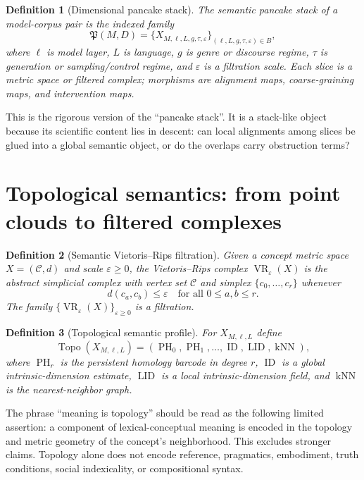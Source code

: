 \documentclass[11pt]{article}
\newtheorem{definition}{Definition}[section]
\newcommand{\Concept}{\mathcal C}
\newcommand{\VR}{\operatorname{VR}}
\newcommand{\ID}{\operatorname{ID}}
\newcommand{\eps}{\varepsilon}
\begin{document}
\begin{definition}[Dimensional pancake stack]
The semantic pancake stack of a model-corpus pair is the indexed family
\[
  \mathfrak P(M,D)=\{X_{M,\ell,L,g,\tau,\eps}\}_{(\ell,L,g,\tau,\eps)\in B},
\]
where $\ell$ is model layer, $L$ is language, $g$ is genre or discourse regime, $\tau$ is generation or sampling/control regime, and $\eps$ is a filtration scale.  Each slice is a metric space or filtered complex; morphisms are alignment maps, coarse-graining maps, and intervention maps.
\end{definition}

This is the rigorous version of the ``pancake stack''.  It is a stack-like object because its scientific content lies in descent: can local alignments among slices be glued into a global semantic object, or do the overlaps carry obstruction terms?

\section{Topological semantics: from point clouds to filtered complexes}

\begin{definition}[Semantic Vietoris--Rips filtration]
Given a concept metric space $X=(\Concept,d)$ and scale $\eps\ge0$, the Vietoris--Rips complex $\VR_\eps(X)$ is the abstract simplicial complex with vertex set $\Concept$ and simplex $\{c_0,\dots,c_r\}$ whenever
\[
  d(c_a,c_b)\le \eps\quad\text{for all }0\le a,b\le r.
\]
The family $\{\VR_\eps(X)\}_{\eps\ge0}$ is a filtration.
\end{definition}

\begin{definition}[Topological semantic profile]
For $X_{M,\ell,L}$ define
\[
  \operatorname{Topo}(X_{M,\ell,L})=
  \left(\operatorname{PH}_0,\operatorname{PH}_1,\dots,\ID,\operatorname{LID},\operatorname{kNN}\right),
\]
where $\operatorname{PH}_r$ is the persistent homology barcode in degree $r$, $\ID$ is a global intrinsic-dimension estimate, $\operatorname{LID}$ is a local intrinsic-dimension field, and $\operatorname{kNN}$ is the nearest-neighbor graph.
\end{definition}

The phrase ``meaning is topology'' should be read as the following limited assertion: a component of lexical-conceptual meaning is encoded in the topology and metric geometry of the concept's neighborhood.  This excludes stronger claims.  Topology alone does not encode reference, pragmatics, embodiment, truth conditions, social indexicality, or compositional syntax.
\end{document}
